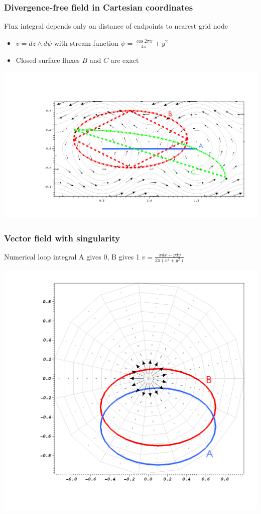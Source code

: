 \documentclass[aspectratio=169]{beamer}
\begin{document}
\begin{frame}[t]
  \frametitle{Divergence-free field in Cartesian coordinates}
  \begin{block}{Flux integral depends only on distance of endpoints to nearest grid node}
  \end{block}
  \begin{itemize}
  \item $v = dz \wedge d\psi$
  with stream function $\psi = \frac{\cos 2 \pi x}{4 \pi} + y^2$
  \item Closed surface fluxes $B$ and $C$ are exact 
  \end{itemize}
  \begin{center}
    \includegraphics[width=.7\linewidth]{flow.png}
  \end{center}
\end{frame}

\begin{frame}[t]
  \frametitle{Vector field with singularity}
  \begin{block}{Numerical loop integral A gives 0, B gives 1}
   $v = \frac{x dx + y dy}{2 \pi (x^2 + y^2)}$
  \end{block}
  \begin{center}
    \includegraphics[width=.5\linewidth]{polar.png}
  \end{center}
\end{frame}
\end{document}
